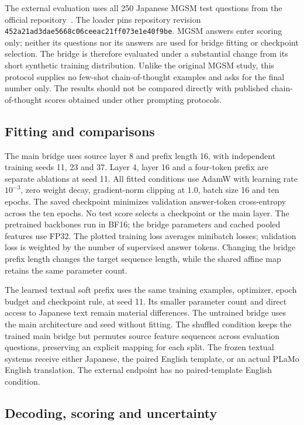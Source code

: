 The external evaluation uses all 250 Japanese MGSM test questions from the official repository~\citep{shi2022mgsm}.
The loader pins repository revision \texttt{452a21ad3dae5668c06ceeac21ff073e1e40f9be}.
MGSM answers enter scoring only; neither its questions nor its answers are used for bridge fitting or checkpoint selection.
The bridge is therefore evaluated under a substantial change from its short synthetic training distribution.
Unlike the original MGSM study, this protocol supplies no few-shot chain-of-thought examples and asks for the final number only.
The results should not be compared directly with published chain-of-thought scores obtained under other prompting protocols.

\subsection{Fitting and comparisons}

The main bridge uses source layer 8 and prefix length 16, with independent training seeds 11, 23 and 37.
Layer 4, layer 16 and a four-token prefix are separate ablations at seed 11.
All fitted conditions use AdamW with learning rate $10^{-3}$, zero weight decay, gradient-norm clipping at 1.0, batch size 16 and ten epochs.
The saved checkpoint minimizes validation answer-token cross-entropy across the ten epochs.
No test score selects a checkpoint or the main layer.
The pretrained backbones run in BF16; the bridge parameters and cached pooled features use FP32.
The plotted training loss averages minibatch losses; validation loss is weighted by the number of supervised answer tokens.
Changing the bridge prefix length changes the target sequence length, while the shared affine map retains the same parameter count.

The learned textual soft prefix uses the same training examples, optimizer, epoch budget and checkpoint rule, at seed 11.
Its smaller parameter count and direct access to Japanese text remain material differences.
The untrained bridge uses the main architecture and seed without fitting.
The shuffled condition keeps the trained main bridge but permutes source feature sequences across evaluation questions, preserving an explicit mapping for each split.
The frozen textual systems receive either Japanese, the paired English template, or an actual PLaMo English translation.
The external endpoint has no paired-template English condition.

\subsection{Decoding, scoring and uncertainty}

